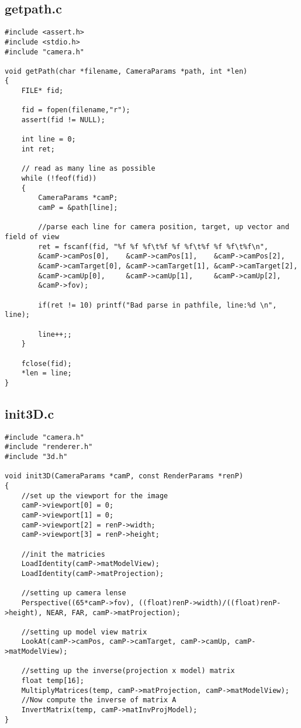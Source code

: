 \documentclass[]{article}
\begin{document}
\subsection{getpath.c}
\begin{Verbatim}[fontsize= \footnotesize, tabsize=4]
#include <assert.h>
#include <stdio.h>
#include "camera.h"

void getPath(char *filename, CameraParams *path, int *len)
{
	FILE* fid;

	fid = fopen(filename,"r");
	assert(fid != NULL);

	int line = 0;
	int ret;

	// read as many line as possible
	while (!feof(fid))
	{
		CameraParams *camP;
		camP = &path[line];

		//parse each line for camera position, target, up vector and field of view
		ret = fscanf(fid, "%f %f %f\t%f %f %f\t%f %f %f\t%f\n",  	
		&camP->camPos[0],    &camP->camPos[1],    &camP->camPos[2],
	    &camP->camTarget[0], &camP->camTarget[1], &camP->camTarget[2],
		&camP->camUp[0],     &camP->camUp[1],     &camP->camUp[2],
		&camP->fov);

		if(ret != 10) printf("Bad parse in pathfile, line:%d \n", line);

		line++;;
	}

	fclose(fid);
	*len = line;
}

\end{Verbatim}

\subsection{init3D.c}
\begin{Verbatim}[fontsize= \footnotesize, tabsize=4]
#include "camera.h"
#include "renderer.h"
#include "3d.h"

void init3D(CameraParams *camP, const RenderParams *renP)
{
	//set up the viewport for the image
	camP->viewport[0] = 0;
	camP->viewport[1] = 0;
	camP->viewport[2] = renP->width;
	camP->viewport[3] = renP->height;
	
	//init the matricies
	LoadIdentity(camP->matModelView);
	LoadIdentity(camP->matProjection);
	
	//setting up camera lense
	Perspective((65*camP->fov), ((float)renP->width)/((float)renP->height), NEAR, FAR, camP->matProjection);
	
	//setting up model view matrix
	LookAt(camP->camPos, camP->camTarget, camP->camUp, camP->matModelView);

	//setting up the inverse(projection x model) matrix
	float temp[16];
	MultiplyMatrices(temp, camP->matProjection, camP->matModelView);
	//Now compute the inverse of matrix A
	InvertMatrix(temp, camP->matInvProjModel);
}
\end{Verbatim}
\end{document}
